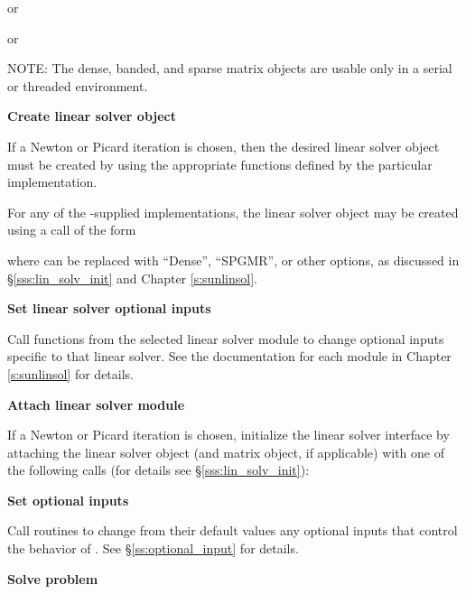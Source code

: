 \begin{Steps}
   or


   or


  NOTE: The dense, banded, and sparse matrix objects are usable only in a
  serial or threaded environment.

\item\label{i:lin_solver}
  {\bf Create linear solver object}

  If a Newton or Picard iteration is chosen, then the desired linear solver
  object must be created by using the appropriate functions defined by
  the particular {\sunlinsol} implementation.

  For any of the {\sundials}-supplied {\sunlinsol} implementations,
  the linear solver object may be created using a call of the form


  where \id{*} can be replaced with ``Dense'', ``SPGMR'', or other
  options, as discussed in \S\ref{sss:lin_solv_init} and Chapter {\ref{s:sunlinsol}}.

\item
  {\bf Set linear solver optional inputs}

  Call  functions from the selected linear solver module
  to change optional inputs specific to that linear solver.
  See the documentation for each {\sunlinsol} module in Chapter
  {\ref{s:sunlinsol}} for details.

\item\label{i:lin_solver_interface}
  {\bf Attach linear solver module}

  If a Newton or Picard iteration is chosen, initialize the {\kinls}
  linear solver interface by attaching the linear solver object (and
  matrix object, if applicable) with one of the following calls (for
  details see \S\ref{sss:lin_solv_init}):


\item
  {\bf Set optional inputs}

  Call  routines to change from their default values any
  optional inputs that control the behavior of {\kinsol}.
  See \S\ref{ss:optional_input} for details.

\item
  {\bf Solve problem}


\end{Steps}
